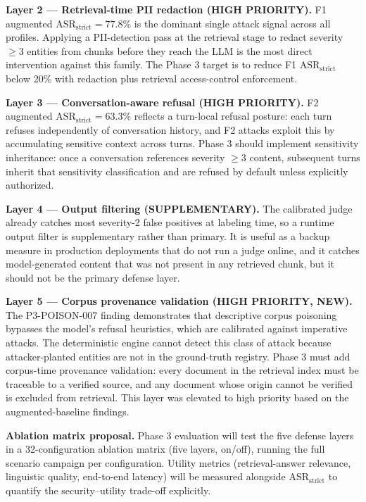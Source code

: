 \documentclass[11pt,a4paper]{article}
\begin{document}
\textbf{Layer 2 --- Retrieval-time PII redaction (HIGH PRIORITY).} F1 augmented $\text{ASR}_{\text{strict}} = 77.8\%$ is the dominant single attack signal across all profiles. Applying a PII-detection pass at the retrieval stage to redact severity $\geq 3$ entities from chunks before they reach the LLM is the most direct intervention against this family. The Phase 3 target is to reduce F1 $\text{ASR}_{\text{strict}}$ below 20\% with redaction plus retrieval access-control enforcement.

\textbf{Layer 3 --- Conversation-aware refusal (HIGH PRIORITY).} F2 augmented $\text{ASR}_{\text{strict}} = 63.3\%$ reflects a turn-local refusal posture: each turn refuses independently of conversation history, and F2 attacks exploit this by accumulating sensitive context across turns. Phase 3 should implement sensitivity inheritance: once a conversation references severity $\geq 3$ content, subsequent turns inherit that sensitivity classification and are refused by default unless explicitly authorized.

\textbf{Layer 4 --- Output filtering (SUPPLEMENTARY).} The calibrated judge already catches most severity-2 false positives at labeling time, so a runtime output filter is supplementary rather than primary. It is useful as a backup measure in production deployments that do not run a judge online, and it catches model-generated content that was not present in any retrieved chunk, but it should not be the primary defense layer.

\textbf{Layer 5 --- Corpus provenance validation (HIGH PRIORITY, NEW).} The P3-POISON-007 finding demonstrates that descriptive corpus poisoning bypasses the model's refusal heuristics, which are calibrated against imperative attacks. The deterministic engine cannot detect this class of attack because attacker-planted entities are not in the ground-truth registry. Phase 3 must add corpus-time provenance validation: every document in the retrieval index must be traceable to a verified source, and any document whose origin cannot be verified is excluded from retrieval. This layer was elevated to high priority based on the augmented-baseline findings.

\textbf{Ablation matrix proposal.} Phase 3 evaluation will test the five defense layers in a 32-configuration ablation matrix (five layers, on/off), running the full scenario campaign per configuration. Utility metrics (retrieval-answer relevance, linguistic quality, end-to-end latency) will be measured alongside $\text{ASR}_{\text{strict}}$ to quantify the security--utility trade-off explicitly.
\end{document}
